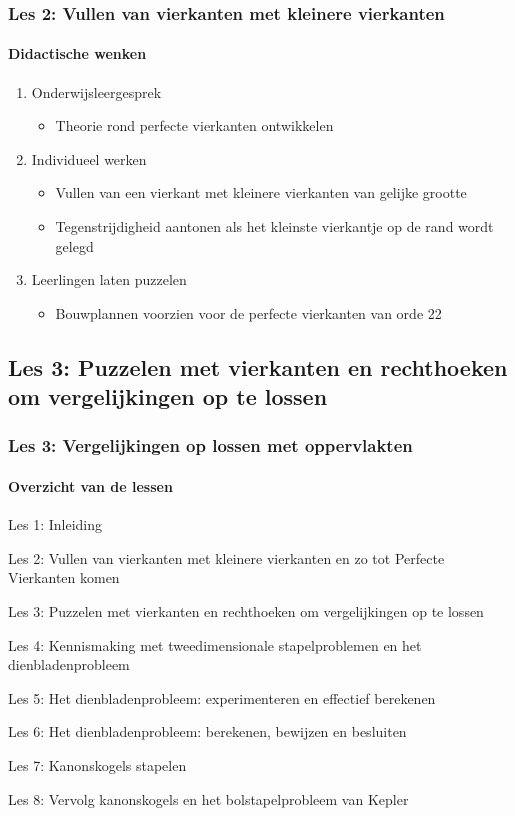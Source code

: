 \documentclass[dutch]{beamer}
\begin{document}
\begin{frame}
  \frametitle{Les 2: Vullen van vierkanten met kleinere vierkanten}
  \framesubtitle{Didactische wenken}
  \begin{enumerate}
    \item Onderwijsleergesprek 
      \begin{itemize}
        \item Theorie rond perfecte vierkanten ontwikkelen
      \end{itemize}
    \item Individueel werken
      \begin{itemize}
        \item Vullen van een vierkant met kleinere vierkanten van gelijke grootte
        \item Tegenstrijdigheid aantonen als het kleinste vierkantje op de rand wordt gelegd
      \end{itemize}
    \item Leerlingen laten puzzelen
      \begin{itemize}
        \item Bouwplannen voorzien voor de perfecte vierkanten van orde 22
      \end{itemize}
  \end{enumerate}
\end{frame}



\subsection{Les 3: Puzzelen met vierkanten en rechthoeken om vergelijkingen op te lossen}
\begin{frame}
\frametitle{Les 3: Vergelijkingen op lossen met oppervlakten}
\framesubtitle{Overzicht van de lessen}
\begin{list}{\quad}{}
\item Les 1: Inleiding
\item Les 2: Vullen van vierkanten met kleinere vierkanten en zo tot Perfecte Vierkanten komen
\item {\color{blue}Les 3: Puzzelen met vierkanten en rechthoeken om vergelijkingen op te lossen}
\item Les 4: Kennismaking met tweedimensionale stapelproblemen en het dienbladenprobleem 
\item Les 5: Het dienbladenprobleem: experimenteren en effectief berekenen
\item Les 6: Het dienbladenprobleem: berekenen, bewijzen en besluiten
\item Les 7: Kanonskogels stapelen
\item Les 8: Vervolg kanonskogels en het bolstapelprobleem van Kepler
\end{list}
\end{frame}
\end{document}
